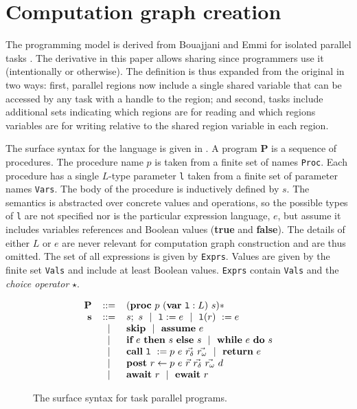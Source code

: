 \section{Computation graph creation} \label{sec:cg}

The programming model is derived from Bouajjani and Emmi for isolated parallel tasks \cite{bouajjani}. The derivative in this paper allows sharing since programmers use it (intentionally or otherwise). The definition is thus expanded from the original in two ways: first, parallel regions now include a single shared variable that can be accessed by any task with a handle to the region; and second, tasks include additional sets indicating which regions are for reading and which regions variables are for writing relative to the shared region variable in each region.

The surface syntax for the language is given in . A program \textbf{P} is a sequence of procedures. The procedure name $p$ is taken from a finite set of names \texttt{Proc}. Each procedure has a single $L$-type parameter \texttt{l} taken from a finite set of parameter names \texttt{Vars}. The body of the procedure is inductively defined by $s$. The semantics is abstracted over concrete values and operations, so the possible types of \texttt{l} are not specified nor is the particular expression language, $e$, but assume it includes variables references and Boolean values (\textbf{true} and \textbf{false}). The details of either $L$ or $e$ are never relevant for computation graph construction and are thus omitted. The set of all expressions is given by \texttt{Exprs}. Values are given by the finite set \texttt{Vals} and include at least Boolean values. \texttt{Exprs} contain \texttt{Vals} and the \emph{choice operator} $\star$. 

\begin{figure}
  \begin{center}
\[
  \begin{array}{rcl}
\textbf{P} &::=& (\textbf{proc}~p~(\textbf{var}\ \texttt{l} : L)~s)* \\
\textbf{s} &::=& s;~s \alt \texttt{l} := e \alt \texttt{l}(r)\ := e \\
&\alt& \textbf{skip} \alt  \textbf{assume}~e \\
&\alt& \textbf{if}~e~\textbf{then}~s~\textbf{else}~s \alt \textbf{while}~e~\textbf{do}~s \\
&\alt& \textbf{call}~\texttt{l}\ := p~e~\vec{r_\delta}~\vec{r_\omega} \alt \textbf{return}~e \\
&\alt& \textbf{post}~r \leftarrow p~e~\vec{r}~\vec{r_\delta}~\vec{r_\omega}~d \\
&\alt& \textbf{await}~r \alt \textbf{ewait}~r \\
  \end{array}
\]
  \end{center}
  \caption{The surface syntax for task parallel programs.}
  \vspace{-2em}
  \label{fig:syntax}
\end{figure}

